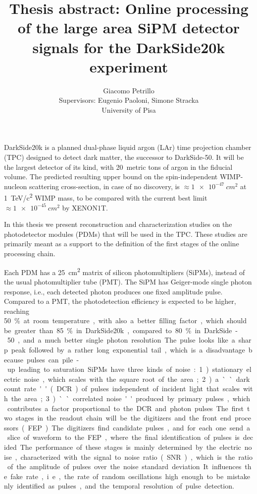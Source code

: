 \documentclass[11pt]{article}
\author{Giacomo Petrillo\\
Supervisors: Eugenio Paoloni, Simone Stracka\\
University of Pisa}
\title{Thesis abstract: Online processing of the large area SiPM detector
signals for the DarkSide20k experiment}
\begin{document}
    
    \maketitle

    DarkSide20k is a planned dual-phase liquid argon (LAr) time projection
    chamber (TPC) designed to detect dark matter, the successor to DarkSide-50.
    It will be the largest detector of its kind, with 20~metric tons of argon
    in the fiducial volume. The predicted resulting upper bound on the
    spin-independent WIMP-nucleon scattering cross-section, in case of no
    discovery, is $\approx\SI{1e-47}{cm^2}$ at \SI{1}{TeV/c^2} WIMP mass, to be
    compared with the current best limit $\approx\SI{1e-45}{cm^2}$ by XENON1T.
    
    In this thesis we present reconstruction and characterization studies on
    the photodetector modules (PDMs) that will be used in the TPC. These
    studies are primarily meant as a support to the definition of the first
    stages of the online processing chain.
    
    Each PDM has a \SI{25}{cm^2} matrix of silicon photomultipliers (SiPMs),
    instead of the usual photomultiplier tube (PMT). The SiPM has Geiger-mode
    single photon response, i.e., each detected photon produces one fixed
    amplitude pulse. Compared to a PMT, the photodetection efficiency is
    expected to be higher, reaching \SI{50}\% at room temperature, with also a
    better filling factor, which should be greater than \SI{85}\% in
    DarkSide20k, compared to \SI{80}\% in DarkSide-50, and a much better single
    photon resolution. The pulse looks like a sharp peak followed by a rather
    long exponential tail, which is a disadvantage because pulses can pile-up
    leading to saturation.
    
    SiPMs have three kinds of noise: 1) stationary electric noise, which scales
    with the square root of the area; 2) a ``dark count rate'' (DCR) of pulses
    independent of incident light that scales with the area; 3) ``correlated
    noise'' produced by primary pulses, which contributes a factor proportional
    to the DCR and photon pulses.
    
    The first two stages in the readout chain will be the digitizers and the
    front end processors (FEP). The digitizers find candidate pulses, and for
    each one send a slice of waveform to the FEP, where the final
    identification of pulses is decided. The performance of these stages is
    mainly determined by the electric noise, characterized with the signal to
    noise ratio (SNR), which is the ratio of the amplitude of pulses over the
    noise standard deviation. It influences the fake rate, i.e., the rate of
    random oscillations high enough to be mistakenly identified as pulses, and
    the temporal resolution of pulse detection.
    
\end{document}
